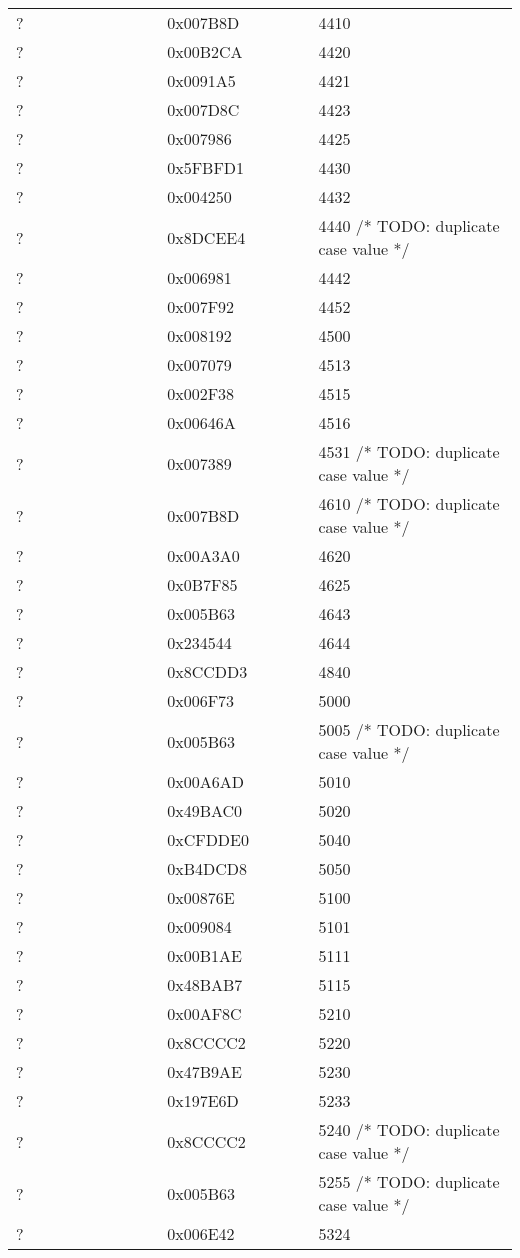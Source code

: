 \begin{longtable}{p{0.3\linewidth} p{0.3\linewidth} p{0.4\linewidth}}
? &  0x007B8D &  4410\\
? &  0x00B2CA &  4420\\
? &  0x0091A5 &  4421\\
? &  0x007D8C &  4423\\
? &  0x007986 &  4425\\
? &  0x5FBFD1 &  4430\\
? &  0x004250 &  4432\\
? &  0x8DCEE4 &  4440 /* TODO: duplicate case value */\\
? &  0x006981 &  4442\\
? &  0x007F92 &  4452\\
? &  0x008192 &  4500\\
? &  0x007079 &  4513\\
? &  0x002F38 &  4515\\
? &  0x00646A &  4516\\
? &  0x007389 &  4531 /* TODO: duplicate case value */\\
? &  0x007B8D &  4610 /* TODO: duplicate case value */\\
? &  0x00A3A0 &  4620\\
? &  0x0B7F85 &  4625\\
? &  0x005B63 &  4643\\
? &  0x234544 &  4644\\
? &  0x8CCDD3 &  4840\\
? &  0x006F73 &  5000\\
? &  0x005B63 &  5005 /* TODO: duplicate case value */\\
? &  0x00A6AD &  5010\\
? &  0x49BAC0 &  5020\\
? &  0xCFDDE0 &  5040\\
? &  0xB4DCD8 &  5050\\
? &  0x00876E &  5100\\
? &  0x009084 &  5101\\
? &  0x00B1AE &  5111\\
? &  0x48BAB7 &  5115\\
? &  0x00AF8C &  5210\\
? &  0x8CCCC2 &  5220\\
? &  0x47B9AE &  5230\\
? &  0x197E6D &  5233\\
? &  0x8CCCC2 &  5240   /* TODO: duplicate case value */\\
? &  0x005B63 &  5255   /* TODO: duplicate case value */\\
? &  0x006E42 &  5324\\

\end{longtable}
